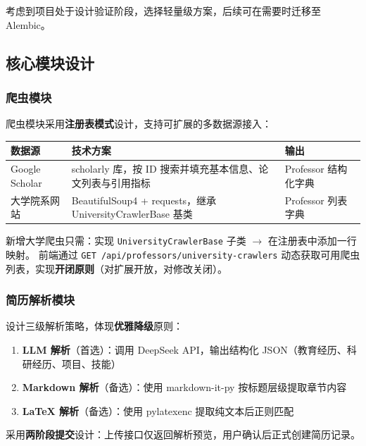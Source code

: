 \documentclass[11pt]{article}
\begin{document}
考虑到项目处于设计验证阶段，选择轻量级方案，后续可在需要时迁移至 Alembic。

\subsection{核心模块设计}

\subsubsection{爬虫模块}

爬虫模块采用\textbf{注册表模式}设计，支持可扩展的多数据源接入：

\begin{center}
\small
\begin{tabular}{|l|p{4.5cm}|p{3.5cm}|}
\hline
\textbf{数据源} & \textbf{技术方案} & \textbf{输出} \\
\hline
Google Scholar & scholarly 库，按 ID 搜索并填充基本信息、论文列表与引用指标 & Professor 结构化字典 \\
\hline
大学院系网站 & BeautifulSoup4 + requests，继承 UniversityCrawlerBase 基类 & Professor 列表字典 \\
\hline
\end{tabular}
\end{center}

新增大学爬虫只需：实现 \texttt{UniversityCrawlerBase} 子类 $\rightarrow$ 在注册表中添加一行映射。
前端通过 \texttt{GET /api/professors/university-crawlers} 动态获取可用爬虫列表，实现\textbf{开闭原则}（对扩展开放，对修改关闭）。

\subsubsection{简历解析模块}

设计三级解析策略，体现\textbf{优雅降级}原则：

\begin{enumerate}
    \item \textbf{LLM 解析}（首选）：调用 DeepSeek API，输出结构化 JSON（教育经历、科研经历、项目、技能）
    \item \textbf{Markdown 解析}（备选）：使用 markdown-it-py 按标题层级提取章节内容
    \item \textbf{LaTeX 解析}（备选）：使用 pylatexenc 提取纯文本后正则匹配
\end{enumerate}

采用\textbf{两阶段提交}设计：上传接口仅返回解析预览，用户确认后正式创建简历记录。
\end{document}
